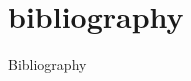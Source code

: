 \section[Bibliography]{bibliography}

\begin{frame}[allowframebreaks]{Bibliography}
    \printbibliography
\end{frame}
